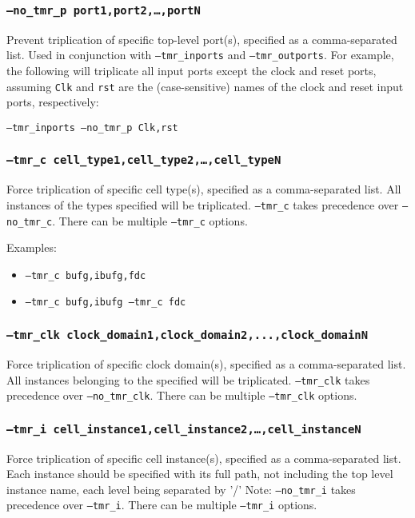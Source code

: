 \documentclass[english]{article}
\begin{document}
\subsubsection{\texttt{--no\_tmr\_p port1,port2,\ldots,portN}}
Prevent triplication of specific top-level port(s), specified as a 
comma-separated list. Used in conjunction with \texttt{--tmr\_inports} and 
\texttt{--tmr\_outports}. For example, the following will triplicate all input 
ports except the clock and reset ports, assuming \texttt{Clk} and \texttt{rst} 
are the (case-sensitive) names of the clock and reset input ports, respectively:

\texttt{--tmr\_inports --no\_tmr\_p Clk,rst} 

\subsubsection{\texttt{--tmr\_c cell\_type1,cell\_type2,\ldots,cell\_typeN}}
Force triplication of specific cell type(s), specified as a comma-separated list. 
All instances of the types specified will be triplicated. \texttt{--tmr\_c}
takes precedence over \texttt{--no\_tmr\_c}. There can be multiple 
\texttt{--tmr\_c} options.

Examples: 
\begin{itemize}
\item \texttt{--tmr\_c bufg,ibufg,fdc}
\item \texttt{--tmr\_c bufg,ibufg --tmr\_c fdc}
\end{itemize}

\subsubsection{\texttt{--tmr\_clk clock\_domain1,clock\_domain2,...,clock\_domainN}}
Force triplication of specific clock domain(s), specified as a comma-separated
list. All instances belonging to the specified will be triplicated.
\texttt{--tmr\_clk}
takes precedence over \texttt{--no\_tmr\_clk}. There can be multiple 
\texttt{--tmr\_clk} options.

\subsubsection{\texttt{--tmr\_i cell\_instance1,cell\_instance2,\ldots,cell\_instanceN}}
Force triplication of specific cell instance(s), specified as a comma-separated
list. Each instance should be specified with its full path, not including the
top level instance name, each level being separated by '/' Note:
\texttt{--no\_tmr\_i} takes precedence over \texttt{--tmr\_i}. There can be
multiple \texttt{--tmr\_i} options.
\end{document}
